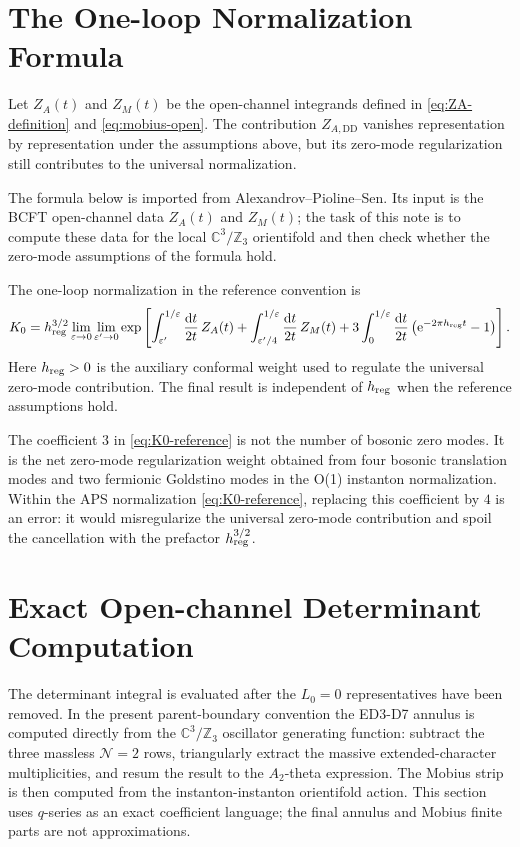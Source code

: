 \documentclass[11pt]{article}
\newcommand{\C}{\mathbb{C}}
\newcommand{\Z}{\mathbb{Z}}
\newcommand{\DD}{\mathrm{DD}}
\newcommand{\dd}{\mathrm{d}}
\newcommand{\e}{\mathrm{e}}
\newcommand{\eps}{\varepsilon}
\begin{document}
\section{The One-loop Normalization Formula}

Let $Z_A(t)$ and $Z_M(t)$ be the open-channel integrands defined in
\eqref{eq:ZA-definition} and \eqref{eq:mobius-open}. The contribution $Z_{A,\DD}$ vanishes
representation by representation under the assumptions above, but its zero-mode
regularization still contributes to the universal normalization.

The formula below is imported from Alexandrov--Pioline--Sen. Its input is the BCFT open-channel
data \(Z_A(t)\) and \(Z_M(t)\); the task of this note is to compute these data for the local
\(\C^3/\Z_3\) orientifold and then check whether the zero-mode assumptions of the formula hold.

The one-loop normalization in the reference convention is
\begin{equation}
  K_0
  =
  h_{\rm reg}^{3/2}
  \lim_{\eps\to 0}
  \lim_{\eps'\to 0}
  \exp\left[
    \int_{\eps'}^{1/\eps}\frac{\dd t}{2t}\,Z_A(t)
    +
    \int_{\eps'/4}^{1/\eps}\frac{\dd t}{2t}\,Z_M(t)
    +
    3\int_{0}^{1/\eps}
      \frac{\dd t}{2t}
      \left(\e^{-2\pi h_{\rm reg}t}-1\right)
  \right].
  \label{eq:K0-reference}
\end{equation}
Here $h_{\rm reg}>0$ is the auxiliary conformal weight used to regulate the universal
zero-mode contribution. The final result is independent of $h_{\rm reg}$ when the reference
assumptions hold.

The coefficient $3$ in \eqref{eq:K0-reference} is not the number of bosonic zero modes. It is
the net zero-mode regularization weight obtained from four bosonic translation modes and two
fermionic Goldstino modes in the O(1) instanton normalization. Within the APS normalization
\eqref{eq:K0-reference}, replacing this coefficient by $4$ is an error: it would misregularize
the universal zero-mode contribution and spoil the cancellation with the prefactor
\(h_{\rm reg}^{3/2}\).


\section{Exact Open-channel Determinant Computation}

The determinant integral is evaluated after the \(L_0=0\) representatives have been removed.
In the present parent-boundary convention the ED3-D7 annulus is computed directly from the
\(\C^3/\Z_3\) oscillator generating function: subtract the three massless \(\mathcal N=2\)
rows, triangularly extract the massive extended-character multiplicities, and resum the result
to the \(A_2\)-theta expression. The Mobius strip is then computed from the
instanton-instanton orientifold action. This section uses \(q\)-series as an exact coefficient
language; the final annulus and Mobius finite parts are not approximations.
\end{document}
